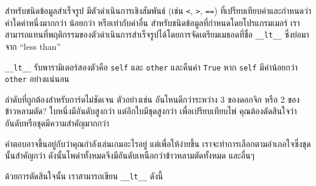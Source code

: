 
สำหรับชนิดข้อมูลสำเร็จรูป มีตัวดำเนินการเชิงสัมพันธ์ (เช่น {\tt <}, {\tt >}, {\tt ==}) ที่เปรียบเทียบค่าและกำหนดว่าค่าใดค่าหนึ่งมากกว่า น้อยกว่า หรือเท่ากับค่าอื่น
สำหรับชนิดข้อมูลที่กำหนดโดยโปรแกรมเมอร์ เราสามารถแทนที่พฤติกรรมของตัวดำเนินการสำเร็จรูปได้โดยการจัดเตรียมเมธอดที่ชื่อ \verb"__lt__" ซึ่งย่อมาจาก ``less than''


\verb"__lt__" รับพารามิเตอร์สองตัวคือ {\tt self} และ {\tt other} และคืนค่า {\tt True} หาก {\tt self} มีค่าน้อยกว่า {\tt other} อย่างแน่นอน



ลำดับที่ถูกต้องสำหรับการ์ดไม่ชัดเจน ตัวอย่างเช่น อันไหนดีกว่าระหว่าง 3 ของดอกจิก หรือ 2 ของข้าวหลามตัด? 
ใบหนึ่งมีอันดับสูงกว่า แต่อีกใบมีชุดสูงกว่า เพื่อเปรียบเทียบไพ่ คุณต้องตัดสินใจว่าอันดับหรือชุดมีความสำคัญมากกว่า



คำตอบอาจขึ้นอยู่กับว่าคุณกำลังเล่นเกมอะไรอยู่ แต่เพื่อให้ง่ายขึ้น เราจะทำการเลือกตามอำเภอใจซึ่งชุดนั้นสำคัญกว่า ดังนั้นโพดำทั้งหมดจึงมีอันดับเหนือกว่าข้าวหลามตัดทั้งหมด และอื่นๆ


ด้วยการตัดสินใจนั้น เราสามารถเขียน \verb"__lt__" ดังนี้

